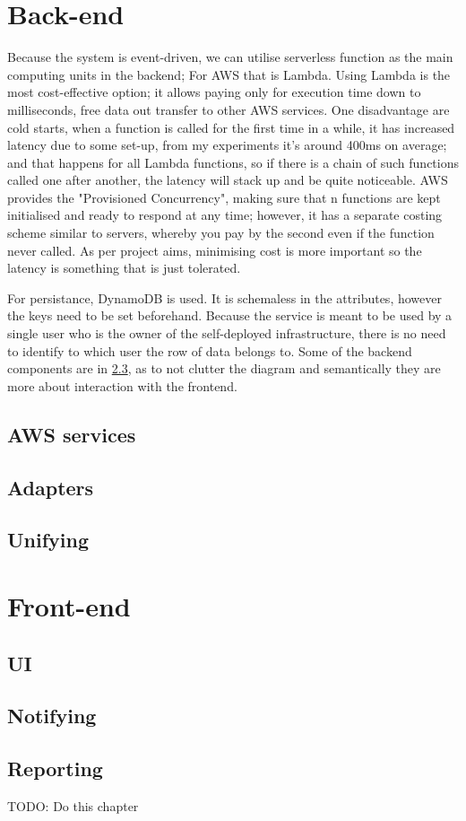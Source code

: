 \section{Back-end}
Because the system is event-driven, we can utilise serverless function as the main computing units in the backend; For AWS that is Lambda. Using Lambda is the most cost-effective option; it allows paying only for execution time down to milliseconds, free data out transfer to other AWS services. One disadvantage are cold starts, when a function is called for the first time in a while, it has increased latency due to some set-up, from my experiments it's around 400ms on average; and that happens for all Lambda functions, so if there is a chain of such functions called one after another, the latency will stack up and be quite noticeable. AWS provides the "Provisioned Concurrency", making sure that n functions are kept initialised and ready to respond at any time; however, it has a separate costing scheme similar to servers, whereby you pay by the second even if the function never called. As per project aims, minimising cost is more important so the latency is something that is just tolerated.

For persistance, DynamoDB is used. It is schemaless in the attributes, however the keys need to be set beforehand. Because the service is meant to be used by a single user who is the owner of the self-deployed infrastructure, there is no need to identify to which user the row of data belongs to. 
Some of the backend components are in \ref {}, as to not clutter the diagram and semantically they are more about interaction with the frontend.
\subsection{AWS services}
\subsection{Adapters}
\subsection{Unifying}
\section{Front-end}
\subsection{UI}
\subsection{Notifying}
\subsection{Reporting}

TODO: Do this chapter
